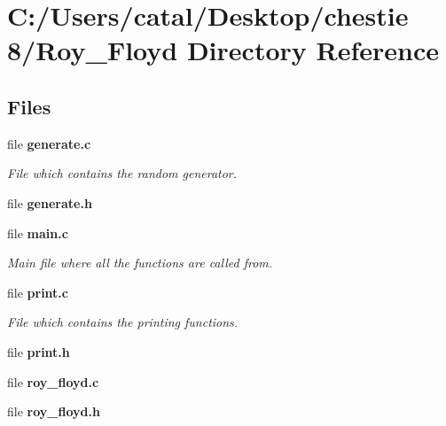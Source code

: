 \section{C\+:/\+Users/catal/\+Desktop/chestie 8/\+Roy\+\_\+\+Floyd Directory Reference}
\label{dir_f6a8beeaf46f648b4d5eb4ce74f8b097}
\subsection*{Files}
\begin{DoxyCompactItemize}
\item 
file \textbf{ generate.\+c}
\begin{DoxyCompactList}\small\item\em File which contains the random generator. \end{DoxyCompactList}\item 
file \textbf{ generate.\+h}
\item 
file \textbf{ main.\+c}
\begin{DoxyCompactList}\small\item\em Main file where all the functions are called from. \end{DoxyCompactList}\item 
file \textbf{ print.\+c}
\begin{DoxyCompactList}\small\item\em File which contains the printing functions. \end{DoxyCompactList}\item 
file \textbf{ print.\+h}
\item 
file \textbf{ roy\+\_\+floyd.\+c}
\item 
file \textbf{ roy\+\_\+floyd.\+h}
\end{DoxyCompactItemize}

